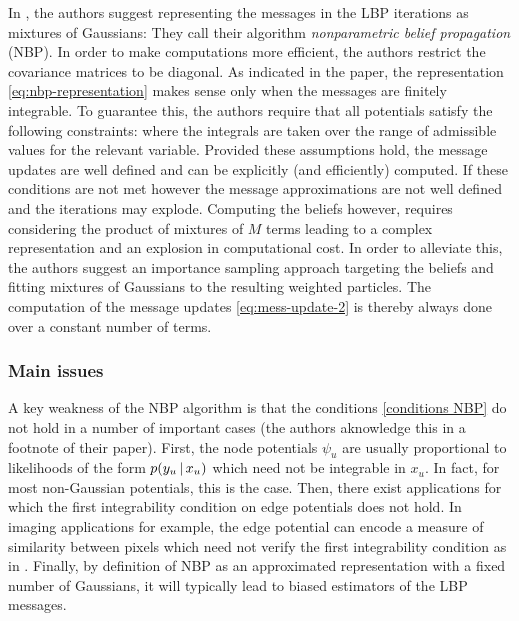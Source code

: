 In \citet{sudderth03}, the authors suggest representing the messages in the LBP iterations as mixtures of Gaussians:
They call their algorithm \emph{nonparametric belief propagation} (NBP). In order to make computations more efficient, the authors restrict the covariance matrices to be diagonal.
As indicated in the paper, the representation \eqref{eq:nbp-representation} makes sense only when the messages are finitely integrable. To guarantee this, the authors require that all potentials satisfy the following constraints:
where the integrals are taken over the range of admissible values for the relevant variable. 
Provided these assumptions hold, the message updates are well defined and can be explicitly (and efficiently) computed.
If these conditions are not met however the message approximations are not well defined and the iterations may explode.
Computing the beliefs however, requires considering the product of mixtures of $M$ terms leading to a complex representation and an explosion in computational cost. In order to alleviate this, the authors suggest an importance sampling approach targeting the beliefs and fitting mixtures of Gaussians to the resulting weighted particles. 
The computation of the message updates \eqref{eq:mess-update-2} is thereby always done over a constant number of terms.

\subsubsection*{Main issues}

A key weakness of the NBP algorithm is that the conditions \eqref{conditions NBP} do not hold in a number of important cases (the authors aknowledge this in a footnote of their paper). 
First, the node potentials $\psi_{u}$ are usually proportional to likelihoods of the form $p(y_{u}\,|\, x_{u})$ which need not be integrable in $x_{u}$. In fact, for most non-Gaussian potentials, this is the case. Then, there exist applications for which the first integrability condition on edge potentials does not hold. In imaging applications for example, the edge potential can encode a measure of similarity between pixels which need not verify the first integrability condition as in \citet{nikolova00}. Finally, by definition of NBP as an approximated representation with a fixed number of Gaussians, it will typically lead to biased estimators of the LBP messages.



